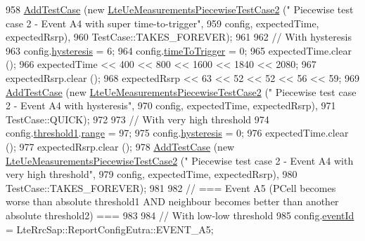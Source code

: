 \begin{DoxyCode}
958   \hyperlink{classns3_1_1TestCase_a3718088e3eefd5d6454569d2e0ddd835}{AddTestCase} (\textcolor{keyword}{new} \hyperlink{classLteUeMeasurementsPiecewiseTestCase2}{LteUeMeasurementsPiecewiseTestCase2} (\textcolor{stringliteral}{"
      Piecewise test case 2 - Event A4 with super time-to-trigger"},
959                                                         config, expectedTime, expectedRsrp),
960                TestCase::TAKES\_FOREVER);
961 
962   \textcolor{comment}{// With hysteresis}
963   config.\hyperlink{structns3_1_1LteRrcSap_1_1ReportConfigEutra_a1fb9169ea261ba20af6a0c18fcc04fa9}{hysteresis} = 6;
964   config.\hyperlink{structns3_1_1LteRrcSap_1_1ReportConfigEutra_aee64b76b166b1beda5bbe1760363ed24}{timeToTrigger} = 0;
965   expectedTime.clear ();
966   expectedTime << 400 << 800 << 1600 << 1840 << 2080;
967   expectedRsrp.clear ();
968   expectedRsrp << 63 << 52 << 52 << 56 << 59;
969   \hyperlink{classns3_1_1TestCase_a3718088e3eefd5d6454569d2e0ddd835}{AddTestCase} (\textcolor{keyword}{new} \hyperlink{classLteUeMeasurementsPiecewiseTestCase2}{LteUeMeasurementsPiecewiseTestCase2} (\textcolor{stringliteral}{"
      Piecewise test case 2 - Event A4 with hysteresis"},
970                                                         config, expectedTime, expectedRsrp),
971                TestCase::QUICK);
972 
973   \textcolor{comment}{// With very high threshold}
974   config.\hyperlink{structns3_1_1LteRrcSap_1_1ReportConfigEutra_a8f36bc45a61054920e490be8bf33b4ca}{threshold1}.\hyperlink{structns3_1_1LteRrcSap_1_1ThresholdEutra_abd4950e20a1a93727535e8364bf85b03}{range} = 97;
975   config.\hyperlink{structns3_1_1LteRrcSap_1_1ReportConfigEutra_a1fb9169ea261ba20af6a0c18fcc04fa9}{hysteresis} = 0;
976   expectedTime.clear ();
977   expectedRsrp.clear ();
978   \hyperlink{classns3_1_1TestCase_a3718088e3eefd5d6454569d2e0ddd835}{AddTestCase} (\textcolor{keyword}{new} \hyperlink{classLteUeMeasurementsPiecewiseTestCase2}{LteUeMeasurementsPiecewiseTestCase2} (\textcolor{stringliteral}{"
      Piecewise test case 2 - Event A4 with very high threshold"},
979                                                         config, expectedTime, expectedRsrp),
980                TestCase::TAKES\_FOREVER);
981 
982   \textcolor{comment}{// === Event A5 (PCell becomes worse than absolute threshold1 AND neighbour becomes better than another
       absolute threshold2) ===}
983 
984   \textcolor{comment}{// With low-low threshold}
985   config.\hyperlink{structns3_1_1LteRrcSap_1_1ReportConfigEutra_a1fbe931cc9584614d20f4affbce70d8a}{eventId} = LteRrcSap::ReportConfigEutra::EVENT\_A5;

\end{DoxyCode}
